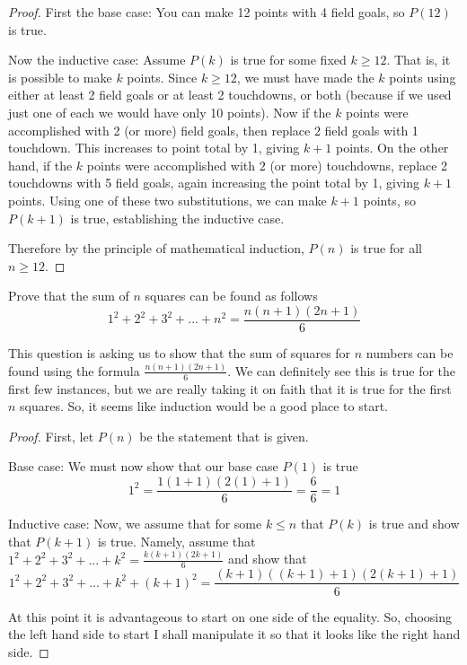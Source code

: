 \begin{questions}
\begin{solution}
\begin{proof}
    First the base case: You can make 12 points with 4 field goals, so $P(12)$ is true.
    
    Now the inductive case: Assume $P(k)$ is true for some fixed $k \ge 12$.  That is, it is possible to make $k$ points.  Since $k \ge 12$, we must have made the $k$ points using either at least 2 field goals or at least 2 touchdowns, or both (because if we used just one of each we would have only 10 points).  Now if the $k$ points were accomplished with 2 (or more) field goals, then replace 2 field goals with 1 touchdown.  This increases to point total by 1, giving $k + 1$ points.  On the other hand, if the $k$ points were accomplished with $2$ (or more) touchdowns, replace 2 touchdowns with 5 field goals, again increasing the point total by 1, giving $k+1$ points.  Using one of these two substitutions, we can make $k+1$ points, so $P(k+1)$ is true, establishing the inductive case.
    
    Therefore by the principle of mathematical induction, $P(n)$ is true for all $n \ge 12$.
  \end{proof}
\end{solution}

\question Prove that the sum of $n$ squares can be found as follows\[1^2 +2^2 +3^2+...+n^2 = \frac{n(n+1)(2n+1)}{6}\]
\begin{solution}
This question is asking us to show that the sum of squares for $n$ numbers can be found using the formula $\frac{n(n+1)(2n+1)}{6}$. We can definitely see this is true for the first few instances, but we are really taking it on faith that it is true for the first $n$ squares. So, it seems like induction would be a good place to start.
\begin{proof}
First, let $P(n)$ be the statement that is given.

Base case: We must now show that our base case $P(1)$ is true \[1^2 = \frac{1(1+1)(2(1)+1)}{6} = \frac{6}{6} =1\]

Inductive case: Now, we assume that for some $k\leq n$ that $P(k)$ is true and show that $P(k+1)$ is true. Namely, assume that $1^2 +2^2 +3^2+...+k^2 = \frac{k(k+1)(2k+1)}{6}$ and show that \[1^2 +2^2 +3^2+...+k^2+{(k+1)}^2 = \frac{(k+1)((k+1)+1)(2(k+1)+1)}{6}\]

At this point it is advantageous to start on one side of the equality. So, choosing the left hand side to start I shall manipulate it so that it looks like the right hand side.


\end{proof}
\end{solution}
\end{questions}
